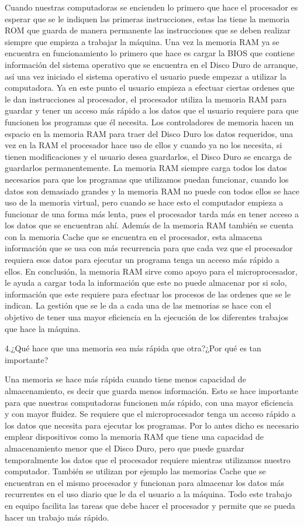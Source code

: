 \documentclass{article}
\begin{document}
Cuando nuestras computadoras se encienden lo primero que hace el procesador es esperar que se le indiquen las primeras instrucciones, estas las tiene la memoria ROM que guarda de manera permanente las instrucciones que se deben realizar siempre que empieza a trabajar la máquina. Una vez la memoria RAM ya se encuentra en funcionamiento lo primero que hace es cargar la BIOS que contiene información del sistema operativo que se encuentra en el Disco Duro de arranque, así una vez iniciado el sistema operativo el usuario puede empezar a utilizar la computadora. Ya en este punto el usuario empieza a efectuar ciertas ordenes que le dan instrucciones al procesador, el procesador utiliza la memoria RAM para guardar y tener un acceso más rápido a los datos que el usuario requiere para que funcionen los programas que él necesita. Los controladores de memoria hacen un espacio en la memoria RAM para traer del Disco Duro los datos requeridos, una vez en la RAM el procesador hace uso de ellos y cuando ya no los necesita, si tienen modificaciones y el usuario desea guardarlos, el Disco Duro se encarga de guardarlos permanentemente. La memoria RAM siempre carga todos los datos necesarios para que los programas que utilizamos puedan funcionar, cuando los datos son demasiado grandes y la memoria RAM no puede con todos ellos se hace uso de la memoria virtual, pero cuando se hace esto el computador empieza a funcionar de una forma más lenta, pues el procesador tarda más en tener acceso a los datos que se encuentran ahí. Además de la memoria RAM también se cuenta con la memoria Cache que se encuentra en el procesador, esta almacena información que se usa con más recurrencia para que cada vez que el procesador requiera esos datos para ejecutar un programa tenga un acceso más rápido a ellos. En conclusión, la memoria RAM sirve como apoyo para el microprocesador, le ayuda a cargar toda la información que este no puede almacenar por si solo, información que este requiere para efectuar los procesos de las ordenes que se le indican.  La gestión que se le da a cada una de las memorias se hace con el objetivo de tener una mayor eficiencia en la ejecución de los diferentes trabajos que hace la máquina.\cite{YouBioit}


4.¿Qué hace que una memoria sea más rápida que otra?¿Por qué es tan importante?


Una memoria se hace más rápida cuando tiene menos capacidad de almacenamiento, es decir que guarda menos información. Esto se hace importante para que nuestras computadoras funcionen más rápido, con una mayor eficiencia y con mayor fluidez. Se requiere que el microprocesador tenga un acceso rápido a los datos que necesita para ejecutar los programas. Por lo antes dicho es necesario emplear dispositivos como la memoria RAM que tiene una capacidad de almacenamiento menor que el Disco Duro, pero que puede guardar temporalmente los datos que el procesador requiere mientras utilizamos nuestro computador. También se utilizan por ejemplo las memorias Cache que se encuentran en el mismo procesador y funcionan para almacenar los datos más recurrentes en el uso diario que le da el usuario a la máquina. Todo este trabajo en equipo facilita las tareas que debe hacer el procesador y permite que se pueda hacer un trabajo más rápido. 
\end{document}
